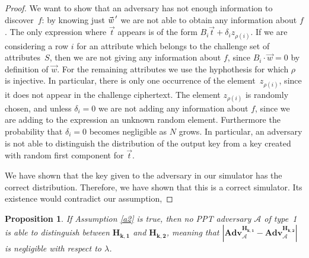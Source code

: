 \documentclass[a4paper,10pt]{article}
\newtheorem{proposition}{Proposition}
\newcommand{\adv}{\textbf{Adv}}
\newcommand{\pvec}[2][]{{\hspace{-0.05em}\vec{\hspace{0.05em}#2}\mkern2mu\vphantom{#2}}^\prime_{\hspace{-0.18em}#1}}
\newcommand{\game}[2]{$\mathbf{#1_{#2}}$}
\newcommand{\mathgame}[2]{\mathbf{#1_{#2}}}
\newcommand{\typeone}{type~1}
\begin{document}
\begin{proof}
		We want to show that an adversary has not enough information to discover~$f$: by knowing just $\pvec{w}$ we are not able to obtain any information about $f$.
		The only expression where $\vec{t}$ appears is of the form $B_i \vec{t} +\delta_i z_{\rho(i)}$.
		If we are considering a row $i$ for an attribute which belongs to the challenge set of attributes~$S$, then we are not giving any information about $f$, since $B_i\cdot \vec{w}=0$ by definition of $\vec{w}$.
		For the remaining attributes we use the hyphothesis for which $\rho$ is injective. In particular, there is only one occurrence of the element~$z_{\rho(i)}$, since it does not appear in the challenge ciphertext.
		The element $z_{\rho(i)}$ is randomly chosen, and unless $\delta_i=0$ we are not adding any information about $f$, since we are adding to the expression an unknown random element.
		Furthermore the probability that $\delta_i=0$ becomes negligible as $N$ grows.
		In particular, an adversary is not able to distinguish the distribution of the output key from a key created with random first component for $\vec{t}$.
		
		We have shown that the key given to the adversary in our simulator has the correct distribution. Therefore, we have shown that this is a correct simulator. Its existence would contradict our assumption, 
	\end{proof}
	\begin{proposition}
		\label{prop.h2}
		If Assumption \ref{a2} is true, then no PPT adversary $\mathcal{A}$ of \typeone{} is able to distinguish between \game{H}{k,1} and \game{H}{k,2}, meaning that $\left| \adv_{\mathcal{A}}^{\mathgame{H}{k,1}} - \adv_{\mathcal{A}}^{\mathgame{H}{k,2}}\right|$ is negligible with respect to $\lambda$.
	\end{proposition}
\end{document}
